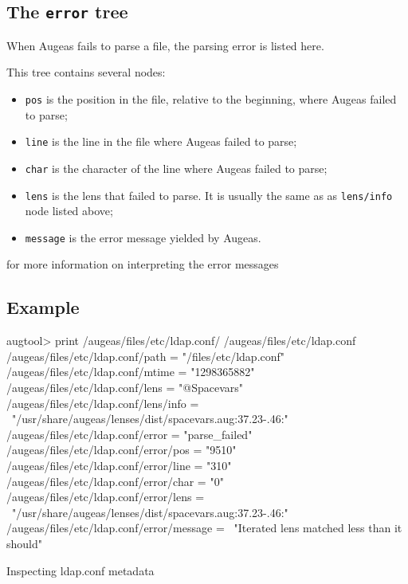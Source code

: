 \subsection{The \texttt{error} tree}

When Augeas fails to parse a file, the parsing error is listed here.

This tree contains several nodes:

\begin{itemize}
\item
  \verb!pos! is the position in the file, relative to the beginning, where Augeas failed to parse;
\item
  \verb!line! is the line in the file where Augeas failed to parse;
\item
  \verb!char! is the character of the line where Augeas failed to parse;
\item
  \verb!lens! is the lens that failed to parse. It is usually the same as as \verb!lens/info! node listed above;
\item
  \verb!message! is the error message yielded by Augeas.
\end{itemize}

 for more information on interpreting the error messages


\subsection{Example}

\begin{listing}
  \begin{augtoolsh}[]
augtool> print /augeas/files/etc/ldap.conf/
/augeas/files/etc/ldap.conf
/augeas/files/etc/ldap.conf/path = "/files/etc/ldap.conf"
/augeas/files/etc/ldap.conf/mtime = "1298365882"
/augeas/files/etc/ldap.conf/lens = "@Spacevars"
/augeas/files/etc/ldap.conf/lens/info = \
   "/usr/share/augeas/lenses/dist/spacevars.aug:37.23-.46:"
/augeas/files/etc/ldap.conf/error = "parse_failed"
/augeas/files/etc/ldap.conf/error/pos = "9510"
/augeas/files/etc/ldap.conf/error/line = "310"
/augeas/files/etc/ldap.conf/error/char = "0"
/augeas/files/etc/ldap.conf/error/lens = \
   "/usr/share/augeas/lenses/dist/spacevars.aug:37.23-.46:"
/augeas/files/etc/ldap.conf/error/message = \
   "Iterated lens matched less than it should"
  \end{augtoolsh}
  \caption{Inspecting ldap.conf metadata}
  \label{lst:metadata_ldap_conf}
\end{listing}

